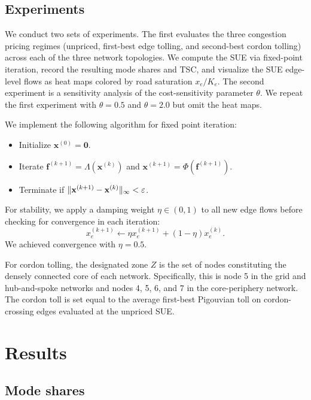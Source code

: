 \documentclass[12pt]{article}
\renewcommand{\vec}[1]{\mathbf{#1}}
\DeclarePairedDelimiter{\norm}{\lVert}{\rVert}
\begin{document}
\subsection{Experiments}

We conduct two sets of experiments.
The first evaluates the three congestion pricing regimes (unpriced, first-best edge tolling, and second-best cordon tolling) across each of the three network topologies.
We compute the SUE via fixed-point iteration, record the resulting mode shares and TSC, and visualize the SUE edge-level flows as heat maps colored by road saturation $x_e/K_e$.
The second experiment is a sensitivity analysis of the cost-sensitivity parameter $\theta$.
We repeat the first experiment with $\theta = 0.5$ and $\theta = 2.0$ but omit the heat maps.

We implement the following algorithm for fixed point iteration:
\begin{itemize}[noitemsep]
    \item Initialize $\vec{x}^{(0)} = \vec{0}$.
    \item Iterate $\vec{f}^{(k+1)} = \Lambda\left(\vec{x}^{(k)}\right)$ and $\vec{x}^{(k+1)} = \Phi\left(\vec{f}^{(k+1)}\right)$.
    \item Terminate if $\norm{\vec{x}^{(k+1)} - \vec{x}^{(k)}}_\infty < \varepsilon$.
\end{itemize}
For stability, we apply a damping weight $\eta \in (0, 1)$ to all new edge flows before checking for convergence in each iteration:
\[
    x_e^{(k+1)} \leftarrow  \eta x_e^{(k+1)} + (1 - \eta) x_e^{(k)}.
\]
We achieved convergence with $\eta = 0.5$.

For cordon tolling, the designated zone $Z$ is the set of nodes constituting the densely connected core of each network.
Specifically, this is node 5 in the grid and hub-and-spoke networks and nodes 4, 5, 6, and 7 in the core-periphery network.
The cordon toll is set equal to the average first-best Pigouvian toll on cordon-crossing edges evaluated at the unpriced SUE.

\section{Results}

\subsection{Mode shares}
\end{document}
